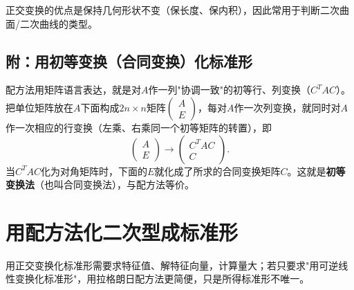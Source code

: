 正交变换的优点是保持几何形状不变（保长度、保内积），因此常用于判断二次曲面/二次曲线的类型。

\subsection*{附：用初等变换（合同变换）化标准形}
配方法用矩阵语言表达，就是对$A$作一列"协调一致"的初等行、列变换（$C^{T}AC$）。把单位矩阵放在$A$下面构成$2n\times n$矩阵$\begin{pmatrix}A\\E\end{pmatrix}$，每对$A$作一次列变换，就同时对$A$作一次相应的行变换（左乘、右乘同一个初等矩阵的转置），即
\[
\begin{pmatrix}A\\E\end{pmatrix}\longrightarrow\begin{pmatrix}C^{T}AC\\C\end{pmatrix}.
\]
当$C^{T}AC$化为对角矩阵时，下面的$E$就化成了所求的合同变换矩阵$C$。这就是\textbf{初等变换法}（也叫合同变换法），与配方法等价。




\section{用配方法化二次型成标准形}

用正交变换化标准形需要求特征值、解特征向量，计算量大；若只要求"用可逆线性变换化标准形"，用拉格朗日配方法更简便，只是所得标准形不唯一。


